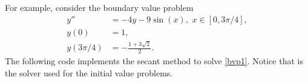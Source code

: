 For example, consider the boundary value problem
\begin{equation}
\begin{split}
\label{bvp1}
y'' &= -4y -9\sin(x), \,\, x \in [0,3\pi/4],\\
y(0) &= 1, \\
y(3 \pi/4) &= -\frac{1+3\sqrt{2}}{2}.
\end{split}
\end{equation}
The following code implements the secant method to solve \eqref{bvp1}.
Notice that  is the solver used for the initial value problems.




% 
% 


